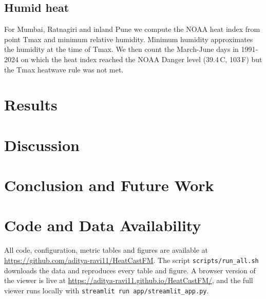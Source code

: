 \documentclass[conference,10pt]{IEEEtran}
\begin{document}
\subsection{Humid heat}
For Mumbai, Ratnagiri and inland Pune we compute the NOAA heat index \cite{rothfusz1990} from point Tmax and minimum relative humidity. Minimum humidity approximates the humidity at the time of Tmax. We then count the March-June days in 1991-2024 on which the heat index reached the NOAA Danger level (39.4\,\textdegree C, 103\,\textdegree F) but the Tmax heatwave rule was not met.

\section{Results}\label{sec:results}


\section{Discussion}\label{sec:discussion}


\section{Conclusion and Future Work}


\section*{Code and Data Availability}
All code, configuration, metric tables and figures are available at \url{https://github.com/aditya-ravi11/HeatCastFM}. The script \texttt{scripts/run\_all.sh} downloads the data and reproduces every table and figure. A browser version of the viewer is live at \url{https://aditya-ravi11.github.io/HeatCastFM/}, and the full viewer runs locally with \texttt{streamlit run app/streamlit\_app.py}.



\end{document}
